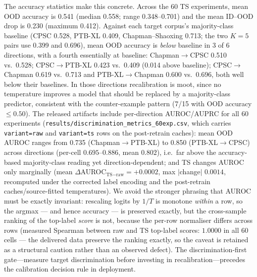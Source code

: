 \documentclass[final,5p,times,nonatbib]{elsarticle}
\begin{document}
The accuracy statistics make this concrete. Across the 60 TS
experiments, mean OOD accuracy is 0.541 (median 0.558; range
0.348--0.701) and the mean ID--OOD drop is 0.230 (maximum 0.412).
Against each target corpus's majority-class baseline (CPSC 0.528,
PTB-XL 0.409, Chapman--Shaoxing 0.713; the two $K{=}5$ pairs use
0.399 and 0.696), mean OOD accuracy is
\emph{below} baseline in 3 of 6 directions, with a fourth essentially
at baseline: Chapman$\rightarrow$CPSC
0.510 vs.\ 0.528; CPSC$\rightarrow$PTB-XL 0.423 vs.\ 0.409 (0.014
above baseline); CPSC$\rightarrow$Chapman 0.619 vs.\ 0.713 and
PTB-XL$\rightarrow$Chapman 0.600 vs.\ 0.696, both well below their
baselines. In those
directions recalibration is moot, since no temperature improves a model that
should be replaced by a majority-class predictor, consistent with
the counter-example pattern (7/15 with OOD accuracy $\leq 0.50$).
The released artifacts include per-direction AUROC/AUPRC for all 60
experiments (\texttt{results/discrimination\_metrics\_60exp.csv},
which carries \texttt{variant=raw} and \texttt{variant=ts} rows on the
post-retrain caches):
mean OOD
AUROC ranges from 0.735 (Chapman$\rightarrow$PTB-XL) to 0.850
(PTB-XL$\rightarrow$CPSC) across directions (per-cell $0.695$--$0.886$,
mean $0.802$), i.e.\ far above the accuracy-based
majority-class reading yet direction-dependent; and TS changes AUROC only
marginally (mean $\Delta$AUROC$_{\text{TS}-\text{raw}} = +0.0002$, max
$|$change$|$ $0.0014$, recomputed under the corrected label encoding and
the post-retrain caches/source-fitted temperatures). We
avoid the stronger phrasing that AUROC must be exactly invariant:
rescaling logits by $1/T$ is monotone \emph{within} a row, so the argmax
--- and hence accuracy --- is preserved exactly, but the cross-sample
ranking of the top-label \emph{score} is not, because the per-row
normaliser differs across rows (measured Spearman between raw and TS
top-label scores: $1.0000$ in all 60 cells --- the delivered data
preserve the ranking exactly, so the caveat is retained as a structural
caution rather than an observed defect). The discrimination-first
gate---measure target discrimination before investing in
recalibration---precedes the calibration decision rule in
deployment.
\end{document}
